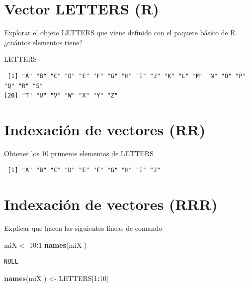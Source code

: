 \documentclass[]{book}
\newenvironment{Shaded}{\begin{snugshade}}{\end{snugshade}}
\newcommand{\DecValTok}[1]{\textcolor[rgb]{0.00,0.00,0.81}{#1}}
\newcommand{\KeywordTok}[1]{\textcolor[rgb]{0.13,0.29,0.53}{\textbf{#1}}}
\newcommand{\NormalTok}[1]{#1}
\newcommand{\OperatorTok}[1]{\textcolor[rgb]{0.81,0.36,0.00}{\textbf{#1}}}
\newcommand{\StringTok}[1]{\textcolor[rgb]{0.31,0.60,0.02}{#1}}
\begin{document}
\hypertarget{vector-letters-r}{%
\section{Vector LETTERS (R)}\label{vector-letters-r}}

Explorar el objeto LETTERS que viene definido con el paquete básico de R ¿cuántos elementos tiene?

\begin{Shaded}
\begin{Highlighting}[]
\NormalTok{LETTERS}
\end{Highlighting}
\end{Shaded}

\begin{verbatim}
 [1] "A" "B" "C" "D" "E" "F" "G" "H" "I" "J" "K" "L" "M" "N" "O" "P" "Q" "R" "S"
[20] "T" "U" "V" "W" "X" "Y" "Z"
\end{verbatim}

\hypertarget{indexaciuxf3n-de-vectores-rr}{%
\section{Indexación de vectores (RR)}\label{indexaciuxf3n-de-vectores-rr}}

Obtener los 10 primeros elementos de LETTERS

\begin{verbatim}
 [1] "A" "B" "C" "D" "E" "F" "G" "H" "I" "J"
\end{verbatim}

\hypertarget{indexaciuxf3n-de-vectores-rrr}{%
\section{Indexación de vectores (RRR)}\label{indexaciuxf3n-de-vectores-rrr}}

Explicar que hacen las siguientes líneas de comando

\begin{Shaded}
\begin{Highlighting}[]
\NormalTok{miX <-}\StringTok{ }\DecValTok{10}\OperatorTok{:}\DecValTok{1}
\KeywordTok{names}\NormalTok{(miX )}
\end{Highlighting}
\end{Shaded}

\begin{verbatim}
NULL
\end{verbatim}

\begin{Shaded}
\begin{Highlighting}[]
\KeywordTok{names}\NormalTok{(miX ) <-}\StringTok{ }\NormalTok{LETTERS[}\DecValTok{1}\OperatorTok{:}\DecValTok{10}\NormalTok{]}
\end{Highlighting}
\end{Shaded}
\end{document}
